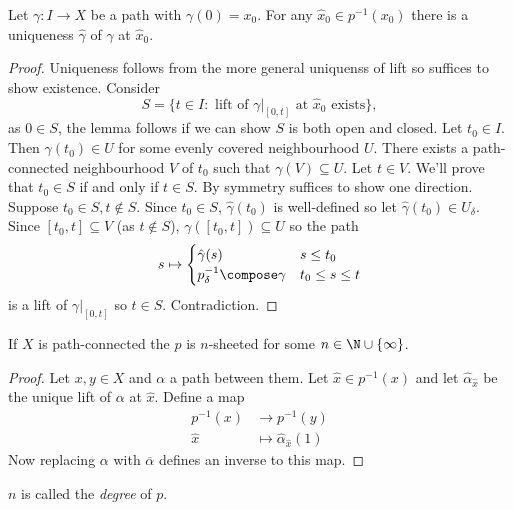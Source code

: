 \documentclass[a4paper]{article}
\begin{document}
\begin{lemma}
  Let \(\gamma: I \to X\) be a path with \(\gamma(0) = x_0\). For any \(\hat x_0 \in p^{-1}(x_0)\) there is a uniqueness \(\hat \gamma\) of \(\gamma\) at \(\hat x_0\).
\end{lemma}

\begin{proof}
  Uniqueness follows from the more general uniquenss of lift so suffices to show existence. Consider
  \[
    S = \{t \in I: \text{ lift of } \gamma|_{[0, t]} \text{ at } \hat x_0 \text{ exists}\},
  \]
  as \(0 \in S\), the lemma follows if we can show \(S\) is both open and closed. Let \(t_0 \in I\). Then \(\gamma(t_0) \in U\) for some evenly covered neighbourhood \(U\). There exists a path-connected neighbourhood \(V\) of \(t_0\) such that \(\gamma(V) \subseteq U\). Let \(t \in V\). We'll prove that \(t_0 \in S\) if and only if \(t \in S\). By symmetry suffices to show one direction. Suppose \(t_0 \in S, t \notin S\). Since \(t_0 \in S\), \(\hat \gamma(t_0)\) is well-defined so let \(\hat \gamma(t_0) \in U_\delta\). Since \([t_0, t] \subseteq V\) (as \(t \notin S\)), \(\gamma([t_0, t]) \subseteq U\) so the path
  \[
    s \mapsto
    \begin{cases}
      \hat \gamma(s) & s \leq t_0 \\
      p_\delta^{-1} \compose \gamma & t_0 \leq s \leq t
    \end{cases}
  \]
  is a lift of \(\gamma|_{[0, t]}\) so \(t \in S\). Contradiction.
\end{proof}

\begin{lemma}
  If \(X\) is path-connected the \(p\) is \(n\)-sheeted for some \(n \in \N \cup \{\infty\}\).
\end{lemma}

\begin{proof}
  Let \(x, y \in X\) and \(\alpha\) a path between them. Let \(\hat x \in p^{-1}(x)\) and let \(\hat \alpha_{\hat x}\) be the unique lift of \(\alpha\) at \(\hat x\). Define a map
  \begin{align*}
    p^{-1} (x) &\to p^{-1}(y) \\
    \hat x &\mapsto \hat \alpha_{\hat x}(1)
  \end{align*}
  Now replacing \(\alpha\) with \(\overline \alpha\) defines an inverse to this map.
\end{proof}

\begin{definition}
  \(n\) is called the \emph{degree} of \(p\).
\end{definition}
\end{document}
